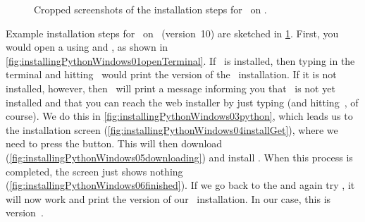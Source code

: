 %
%
\begin{figure}%
\centering%
%
\floatSep%
%
%
%
\floatSep%
%
%
%
\floatRowSep%
%
%
\floatSep%
%
%
%
\floatRowSep%
%
%
%
\floatSep%
%
%
%
\caption{Cropped screenshots of the installation steps for \python\ on \microsoftWindows.}%
\label{fig:installPythonWindows}%
\end{figure}%
%
Example installation steps for \python\ on \microsoftWindows\ (version~10) are sketched in \cref{fig:installPythonWindows}.
First, you would open a  using and \windowsTerminal, as shown in \cref{fig:installingPythonWindows01openTerminal}.
If \python\ is installed, then typing  in the terminal and hitting~\keys{\enter} would print the version of the \python\ installation.
If it is not installed, however, then \microsoftWindows\ will print a message informing you that \python\ is not yet installed and that you can reach the web installer by just typing  (and hitting~\keys{\enter}, of course).
We do this in \cref{fig:installingPythonWindows03python}, which leads us to the installation screen (\cref{fig:installingPythonWindows04installGet}), where we need to press the  button.
This will then download (\cref{fig:installingPythonWindows05downloading}) and install \python.
When this process is completed, the screen just shows nothing (\cref{fig:installingPythonWindows06finished}).
If we go back to the  and again try , it will now work and print the version of our \python\ installation.
In our case, this is version~.%
%
\FloatBarrier%
\endhsection%
%
